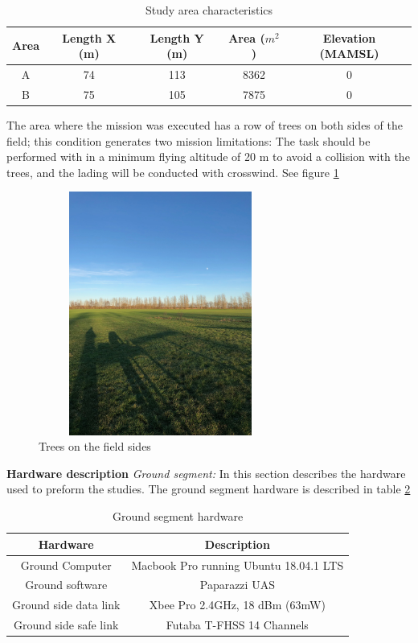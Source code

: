 \begin{table}[H]
\centering
\begin{tabular}{|c|c|c|c|c|}
\hline
Area & Length X (m) & Length Y (m) & Area ($m^2$) & Elevation (MAMSL) \\ \hline
A     & 74           & 113         &  8362     & 0                 \\ \hline
B     & 75           & 105          & 7875      & 0                 \\ \hline
\end{tabular}
\caption{Study area characteristics}
\label{table: Area_char}
\end{table}
The area where the mission was executed has a row of trees on both sides of the field; this condition generates two mission limitations: The task should be performed with in a minimum flying altitude of 20 m to avoid a collision with the trees, and the lading will be conducted with  crosswind. See figure \ref{fig:ARboles}
\begin{figure}[H]
\centering
\includegraphics[width=8cm,height=8cm,keepaspectratio,angle=-90]{imagenes/IMG_1122.JPG}
\caption{Trees on the field sides}
\label{fig:ARboles}
\end{figure}
\textbf{Hardware description}\newline
\textit{Ground segment:}
In this section describes  the hardware used to preform the studies.
The ground segment hardware is described in table \ref{Table:Ground_Hardware}
\begin{table}[H]
\centering
\begin{tabular}{|c|c|}
\hline
Hardware             & Description                            \\ \hline
Ground Computer      & Macbook Pro running Ubuntu 18.04.1 LTS \\ \hline
Ground software      & Paparazzi UAS                          \\ \hline
Ground side data link & Xbee Pro 2.4GHz, 18 dBm (63mW)         \\ \hline
Ground side safe link  & Futaba T-FHSS 14 Channels               \\ \hline
\end{tabular}
\caption{Ground segment hardware}
\label{Table:Ground_Hardware}
\end{table}


